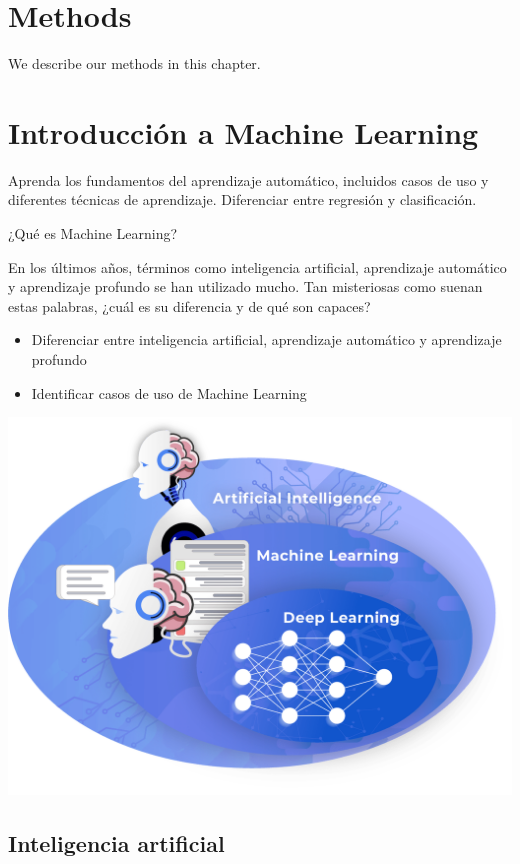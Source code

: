 \documentclass[
]{book}
\providecommand{\tightlist}{%
  \setlength{\itemsep}{0pt}\setlength{\parskip}{0pt}}
\begin{document}
\hypertarget{methods}{%
\chapter{Methods}\label{methods}}

We describe our methods in this chapter.

\hypertarget{introducciuxf3n-a-machine-learning}{%
\chapter{Introducción a Machine Learning}\label{introducciuxf3n-a-machine-learning}}

Aprenda los fundamentos del aprendizaje automático, incluidos casos de uso y diferentes técnicas de aprendizaje. Diferenciar entre regresión y clasificación.

¿Qué es Machine Learning?

En los últimos años, términos como inteligencia artificial, aprendizaje automático y aprendizaje profundo se han utilizado mucho. Tan misteriosas como suenan estas palabras, ¿cuál es su diferencia y de qué son capaces?

\begin{itemize}
\tightlist
\item
  Diferenciar entre inteligencia artificial, aprendizaje automático y aprendizaje profundo
\item
  Identificar casos de uso de Machine Learning
\end{itemize}

\includegraphics{img/int.png}

\hypertarget{inteligencia-artificial}{%
\section{Inteligencia artificial}\label{inteligencia-artificial}}
\end{document}
